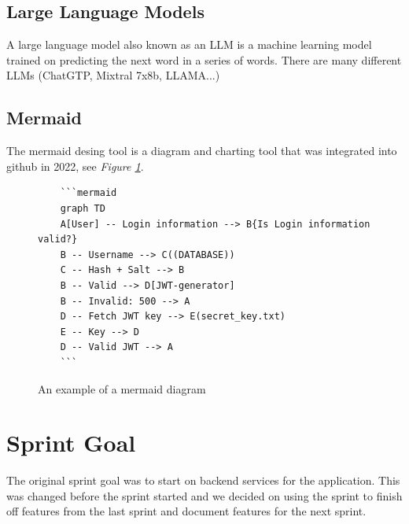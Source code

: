 \documentclass[12pt]{article}
\begin{document}
\subsection{Large Language Models\cite{aiMixtralExperts2023}}
A large language model also known as an LLM is a machine learning model trained on predicting the next word in a series of words.
There are many different LLMs (ChatGTP, Mixtral 7x8b, LLAMA...)
\subsection{Mermaid\cite{MermaidDiagrammingCharting}}
The mermaid desing tool is a diagram and charting tool that was integrated into github in 2022, see \textit{Figure \ref{fig:MM}}.
\begin{figure}[h]
    \begin{verbatim}
    ```mermaid
    graph TD
    A[User] -- Login information --> B{Is Login information valid?}
    B -- Username --> C((DATABASE))
    C -- Hash + Salt --> B
    B -- Valid --> D[JWT-generator]
    B -- Invalid: 500 --> A
    D -- Fetch JWT key --> E(secret_key.txt)
    E -- Key --> D
    D -- Valid JWT --> A
    ```
    \end{verbatim}
    \caption{An example of a mermaid diagram}
    \label{fig:MM}
\end{figure}

\section{Sprint Goal}
The original sprint goal was to start on backend services for the application. This was changed before the sprint started and we decided on using the sprint
to finish off features from the last sprint and document features for the next sprint.
\end{document}
